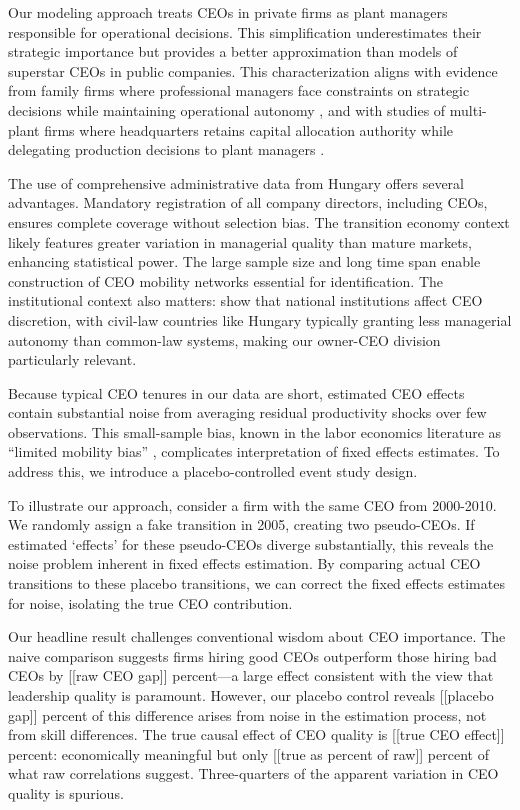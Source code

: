 \documentclass[11pt,a4paper]{article}
\begin{document}
Our modeling approach treats CEOs in private firms as plant managers responsible for operational decisions. This simplification underestimates their strategic importance but provides a better approximation than models of superstar CEOs in public companies. This characterization aligns with evidence from family firms where professional managers face constraints on strategic decisions while maintaining operational autonomy \citep{zellweger2012managing}, and with studies of multi-plant firms where headquarters retains capital allocation authority while delegating production decisions to plant managers \citep{bloom2012americans}.

The use of comprehensive administrative data from Hungary offers several advantages. Mandatory registration of all company directors, including CEOs, ensures complete coverage without selection bias. The transition economy context likely features greater variation in managerial quality than mature markets, enhancing statistical power. The large sample size and long time span enable construction of CEO mobility networks essential for identification. The institutional context also matters: \citet{crossland2011differences} show that national institutions affect CEO discretion, with civil-law countries like Hungary typically granting less managerial autonomy than common-law systems, making our owner-CEO division particularly relevant.

Because typical CEO tenures in our data are short, estimated CEO effects contain substantial noise from averaging residual productivity shocks over few observations. This small-sample bias, known in the labor economics literature as ``limited mobility bias'' \citep{andrews2008high}, complicates interpretation of fixed effects estimates. To address this, we introduce a placebo-controlled event study design.

To illustrate our approach, consider a firm with the same CEO from 2000-2010. We randomly assign a fake transition in 2005, creating two pseudo-CEOs. If estimated `effects' for these pseudo-CEOs diverge substantially, this reveals the noise problem inherent in fixed effects estimation. By comparing actual CEO transitions to these placebo transitions, we can correct the fixed effects estimates for noise, isolating the true CEO contribution.

Our headline result challenges conventional wisdom about CEO importance. The naive comparison suggests firms hiring good CEOs outperform those hiring bad CEOs by [[raw CEO gap]] percent—a large effect consistent with the view that leadership quality is paramount. However, our placebo control reveals [[placebo gap]] percent of this difference arises from noise in the estimation process, not from skill differences. The true causal effect of CEO quality is [[true CEO effect]] percent: economically meaningful but only [[true as percent of raw]] percent of what raw correlations suggest. Three-quarters of the apparent variation in CEO quality is spurious.
\end{document}
